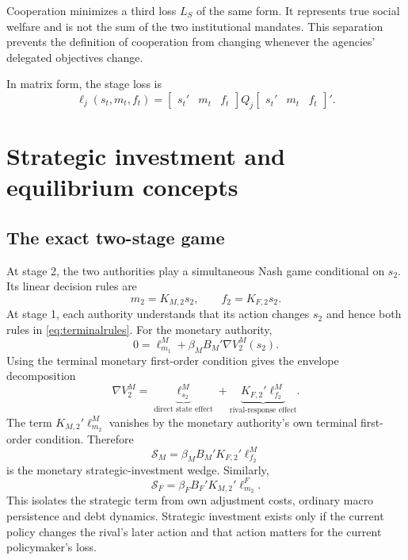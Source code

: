 \documentclass[11pt]{article}
\begin{document}
Cooperation minimizes a third loss $L_S$ of the same form.  It represents true
social welfare and is not the sum of the two institutional mandates.  This
separation prevents the definition of cooperation from changing whenever the
agencies' delegated objectives change.

In matrix form, the stage loss is
\begin{equation}
 \ell_j(s_t,m_t,f_t)=
 \begin{bmatrix}s_t'&m_t&f_t\end{bmatrix}
 Q_j
 \begin{bmatrix}s_t'&m_t&f_t\end{bmatrix}'.             \label{eq:qform}
\end{equation}

\section{Strategic investment and equilibrium concepts}

\subsection{The exact two-stage game}

At stage 2, the two authorities play a simultaneous Nash game conditional on
$s_2$.  Its linear decision rules are
\begin{equation}
 m_2=K_{M,2}s_2,\qquad f_2=K_{F,2}s_2.                  \label{eq:terminalrules}
\end{equation}
At stage 1, each authority understands that its action changes $s_2$ and hence
both rules in \eqref{eq:terminalrules}.  For the monetary authority,
\begin{equation}
 0=\ell^M_{m_1}+\beta_M B_M'\nabla V^M_2(s_2).          \label{eq:stage1foc}
\end{equation}
Using the terminal monetary first-order condition gives the envelope
decomposition
\begin{equation}
 \nabla V^M_2=
 \underbrace{\ell^M_{s_2}}_{\text{direct state effect}}
 +\underbrace{K_{F,2}'\ell^M_{f_2}}_{\text{rival-response effect}}. \label{eq:decomp}
\end{equation}
The term $K_{M,2}'\ell^M_{m_2}$ vanishes by the monetary authority's own
terminal first-order condition.  Therefore
\begin{equation}
 \mathcal S_M=\beta_M B_M'K_{F,2}'\ell^M_{f_2}           \label{eq:sm}
\end{equation}
is the monetary strategic-investment wedge.  Similarly,
\begin{equation}
 \mathcal S_F=\beta_F B_F'K_{M,2}'\ell^F_{m_2}.          \label{eq:sf}
\end{equation}
This isolates the strategic term from own adjustment costs, ordinary macro
persistence and debt dynamics.  Strategic investment exists only if the
current policy changes the rival's later action and that action matters for
the current policymaker's loss.
\end{document}
